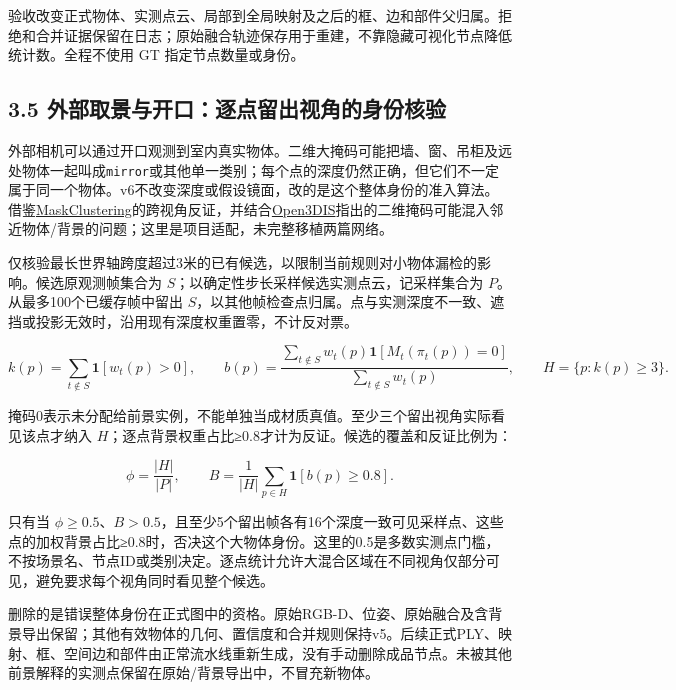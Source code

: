 \documentclass[UTF8,fontset=fandol]{ctexart}
\begin{document}
验收改变正式物体、实测点云、局部到全局映射及之后的框、边和部件父归属。拒绝和合并证据保留在日志；原始融合轨迹保存用于重建，不靠隐藏可视化节点降低统计数。全程不使用 GT 指定节点数量或身份。



\subsection*{3.5 外部取景与开口：逐点留出视角的身份核验}

外部相机可以通过开口观测到室内真实物体。二维大掩码可能把墙、窗、吊柜及远处物体一起叫成\texttt{mirror}或其他单一类别；每个点的深度仍然正确，但它们不一定属于同一个物体。v6不改变深度或假设镜面，改的是这个整体身份的准入算法。借鉴\href{https://arxiv.org/abs/2401.07745}{MaskClustering}的跨视角反证，并结合\href{https://arxiv.org/abs/2312.10671}{Open3DIS}指出的二维掩码可能混入邻近物体/背景的问题；这里是项目适配，未完整移植两篇网络。



仅核验最长世界轴跨度超过3米的已有候选，以限制当前规则对小物体漏检的影响。候选原观测帧集合为 $S$；以确定性步长采样候选实测点云，记采样集合为 $P$。从最多100个已缓存帧中留出 $S$，以其他帧检查点归属。点与实测深度不一致、遮挡或投影无效时，沿用现有深度权重置零，不计反对票。



\[
k(p)=\sum_{t\notin S}\mathbf1[w_t(p)>0],\qquad
b(p)=\frac{\sum_{t\notin S}w_t(p)\mathbf1[M_t(\pi_t(p))=0]}{\sum_{t\notin S}w_t(p)},\qquad
H=\{p:k(p)\ge3\}.
\]

掩码0表示未分配给前景实例，不能单独当成材质真值。至少三个留出视角实际看见该点才纳入 $H$；逐点背景权重占比≥0.8才计为反证。候选的覆盖和反证比例为：



\[
\phi=\frac{|H|}{|P|},\qquad
B=\frac{1}{|H|}\sum_{p\in H}\mathbf1[b(p)\ge0.8].
\]

只有当 $\phi\ge0.5$、$B>0.5$，且至少5个留出帧各有16个深度一致可见采样点、这些点的加权背景占比≥0.8时，否决这个大物体身份。这里的0.5是多数实测点门槛，不按场景名、节点ID或类别决定。逐点统计允许大混合区域在不同视角仅部分可见，避免要求每个视角同时看见整个候选。



删除的是错误整体身份在正式图中的资格。原始RGB-D、位姿、原始融合及含背景导出保留；其他有效物体的几何、置信度和合并规则保持v5。后续正式PLY、映射、框、空间边和部件由正常流水线重新生成，没有手动删除成品节点。未被其他前景解释的实测点保留在原始/背景导出中，不冒充新物体。
\end{document}

